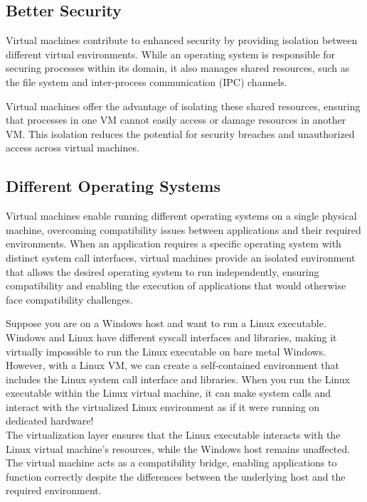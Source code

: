 \documentclass{report}
\newcommand{\exampleBegin}[1]{\begin{tcolorbox}[colback=blue!5!white,colframe=black!75!blue,title={Example:
      #1}]}
\newcommand{\exampleEnd}{\end{tcolorbox}}
\begin{document}
\subsection{Better Security}
Virtual machines contribute to enhanced security by providing isolation between different virtual
environments. While an operating system is responsible for securing processes within its domain, it
also manages shared resources, such as the file system and inter-process communication (IPC)
channels.

Virtual machines offer the advantage of isolating these shared resources, ensuring that processes in
one VM cannot easily access or damage resources in another VM. This isolation reduces the potential
for security breaches and unauthorized access across virtual machines.


\subsection{Different Operating Systems}
Virtual machines enable running different operating systems on a single physical machine, overcoming
compatibility issues between applications and their required environments. When an application
requires a specific operating system with distinct system call interfaces, virtual machines provide
an isolated environment that allows the desired operating system to run independently, ensuring
compatibility and enabling the execution of applications that would otherwise face compatibility
challenges. 

\exampleBegin{Looking into the Window of Linux}
Suppose you are on a Windows host and want to run a Linux executable. Windows and Linux have
different syscall interfaces and libraries, making it virtually impossible to run the Linux
executable on bare metal Windows. \\

However, with a Linux VM, we can create a self-contained environment that includes the Linux system
call interface and libraries. When you run the Linux executable within the Linux virtual machine, it
can make system calls and interact with the virtualized Linux environment as if it were running on
dedicated hardware! \\

The virtualization layer ensures that the Linux executable interacts with the Linux virtual
machine's resources, while the Windows host remains unaffected. The virtual machine acts as a
compatibility bridge, enabling applications to function correctly despite the differences between
the underlying host and the required environment. 
\exampleEnd
\end{document}
